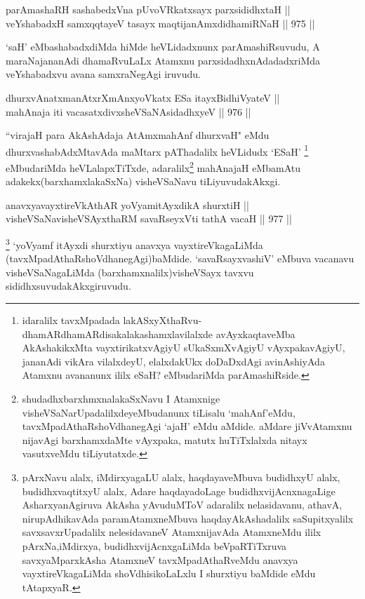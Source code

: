 
\begin{shl}
parAmashaRH sashabedxVna pUvoVRkatxsayx parxsididhxtaH || \\
veYshabadxH samxqqtayeV tasayx maqtijanAmxdidhamiRNaH ||  975 ||  
\end{shl}

\begin{artha}
`saH' eMbashabadxdiMda hiMde heVLidadxnunx parAmashiRsuvudu, A maraNajananAdi dhamaRvuLaLx Atamxnu parxsidadhxnAdadadxriMda veYshabadxvu avana samxraNegAgi iruvudu.
\end{artha}


\begin{shl}
dhurxvAnatxmanAtxrXmAnxyoVkatx ESa itayxBidhiVyateV || \\
mahAnaja iti vacasatxdivxsheVSaNAsidadhxyeV ||  976 ||  
\end{shl}

\begin{artha}
``virajaH para AkAshAdaja AtAmxmahAnf dhurxvaH" eMdu dhurxvashabAdxMtavAda maMtarx pAThadalilx heVLidudx `ESaH' \footnote{idaralilx tavxMpadada lakASxyXthaRvu-dhamARdhamARdisakalakashamxlavilalxde avAyxkaqtaveMba AkAshakikxMta vayxtirikatxvAgiyU sUkaSxmXvAgiyU vAyxpakavAgiyU, jananAdi vikAra vilalxdeyU, elalxdakUkx doDaDxdAgi avinAshiyAda Atamxnu avananunx ililx eSaH? eMbudariMda parAmashiRside.} eMbudariMda heVLalapxTiTxde, adaralilx\footnote{shudadhxbarxhmxnalakaSxNavu I Atamxnige visheVSaNarUpadalilxdeyeMbudanunx tiLisalu `mahAnf'eMdu, tavxMpadAthaRshoVdhanegAgi `ajaH' eMdu aMdide. aMdare jiVvAtamxnu nijavAgi barxhamxdaMte vAyxpaka, matutx huTiTxlalxda nitayx vasutxveMdu tiLiyutatxde.} mahAnajaH eMbamAtu adakekx(barxhamxlakaSxNa) visheVSaNavu tiLiyuvudakAkxgi.
\end{artha}


\begin{shl}
anavxyavayxtireVkAthAR yoV\s yamitAyxdikA shurxtiH || \\
visheVSaNavisheVSAyxthaRM savaRseyxVti tathA vacaH ||  977 ||  
\end{shl}

\begin{artha}
\footnote{pArxNavu alalx, iMdirxyagaLU alalx, haqdayaveMbuva budidhxyU alalx, budidhxvaqtitxyU alalx, Adare haqdayadoLage budidhxvijAcnxnagaLige AsharxyanAgiruva AkAsha yAvuduMToV adaralilx nelasidavanu, athavA, nirupAdhikavAda paramAtamxneMbuva haqdayAkAshadalilx saSupitxyalilx savxsavxrUpadalilx nelesidavaneV AtamxnijavAda AtamxneMdu ililx pArxNa,iMdirxya, budidhxvijAcnxgaLiMda beVpaRTiTxruva savxyaMparxkAsha AtamxneV tavxMpadAthaRveMdu anavxya vayxtireVkagaLiMda shoVdhisikoLaLxlu I shurxtiyu baMdide eMdu tAtapxyaR.} `yoV\s yamf  itAyxdi shurxtiyu anavxya vayxtireVkagaLiMda (tavxMpadAthaRshoVdhanegAgi)baMdide. `savaRsayxvashiV' eMbuva vacanavu visheVSaNagaLiMda (barxhamxnalilx)visheVSayx tavxvu sididhxsuvudakAkxgiruvudu.
\end{artha}

